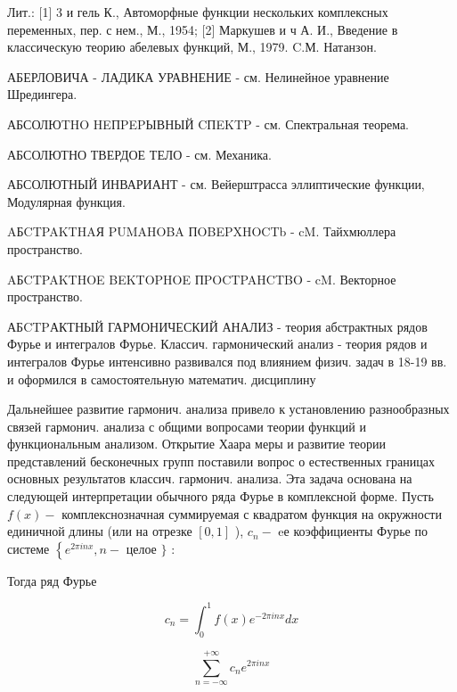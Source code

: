 \documentclass[10pt]{article}
\begin{document}
Лит.: [1] 3 и гель К., Автоморфные функции нескольких комплексных переменных, пер. с нем., М., 1954; [2] Маркушев и ч А. И., Введение в классическую теорию абелевых функций, М., 1979. C.М. Натанзон.



АБЕРЛОВИЧА - ЛАДИКА УРАВНЕНИЕ - см. Нелинейное уравнение Шредингера.



АБСОЛЮTHO HEПPEPЫВНЫЙ CПEKTP - см. Спектральная теорема.



АБСОЛЮТНО ТВЕРДОЕ ТЕЛО - см. Механика.



АБСОЛЮТНЫЙ ИНВАРИАНТ - см. Вейерштрасса эллиптические функции, Модулярная функция.



AБCTPAKTHAЯ PUMAHOBA ПOBEPXHOCTb - cM. Тайхмюллера пространство.



AБCTPAKTHOE BEKTOPHOE ПPOCTPAHCTBO - $\mathrm{cM}$. Векторное пространство.



АБCTPАКТНЫЙ ГАРМОНИЧЕСКИЙ АНАЛИЗ - теория абстрактных рядов Фурье и интегралов Фурье. Классич. гармонический анализ - теория рядов и интегралов Фурье интенсивно развивался под влиянием физич. задач в 18-19 вв. и оформился в самостоятельную математич. дисциплину



Дальнейшее развитие гармонич. анализа привело к установлению разнообразных связей гармонич. анализа с общими вопросами теории функций и функциональным анализом. Открытие Хаара меры и развитие теории представлений бесконечных групп поставили вопрос о естественных границах основных результатов классич. гармонич. анализа. Эта задача основана на следующей интерпретации обычного ряда Фурье в комплексной форме. Пусть $f(x)-$ комплекснозначная суммируемая с квадратом функция на окружности единичной длины (или на отрезке $[0,1]$ ), $c_{n}-$ eе коэффициенты Фурье по системе $\left\{e^{2 \pi i n x}, n-\right.$ целое $\}$ :



Тогда ряд Фурье



\[

c_{n}=\int_{0}^{1} f(x) e^{-2 \pi i n x} d x

\]



\[

\sum_{n=-\infty}^{+\infty} c_{n} e^{2 \pi i n x}

\]
\end{document}
